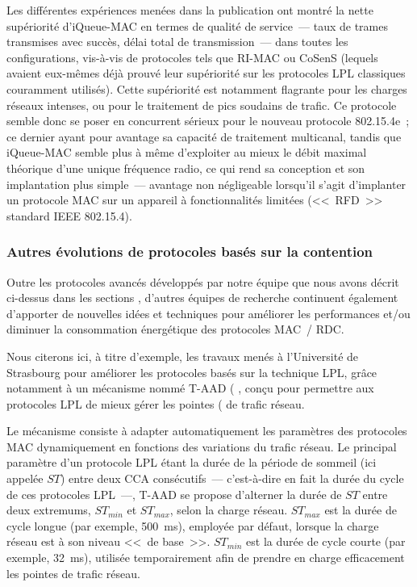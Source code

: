 Les différentes expériences menées dans la publication \cite{iQueueMAC}
ont montré la nette supériorité d'iQueue-MAC en termes de qualité de
service~--- taux de trames transmises avec succès, délai total de
transmission~--- dans toutes les configurations, vis-à-vis de protocoles
tels que RI-MAC ou CoSenS (lequels avaient eux-mêmes déjà prouvé leur
supériorité sur les protocoles LPL classiques couramment utilisés).
Cette supériorité est notamment flagrante pour les charges réseaux intenses,
ou pour le traitement de pics soudains de trafic. Ce protocole semble donc
se poser en concurrent sérieux pour le nouveau protocole 802.15.4e~;
ce dernier ayant pour avantage sa capacité de traitement multicanal, tandis
que iQueue-MAC semble plus à même d'exploiter au mieux le débit maximal
théorique d'une unique fréquence radio, ce qui rend sa conception
et son implantation plus simple~--- avantage non négligeable lorsqu'il
s'agit d'implanter un protocole MAC sur un appareil à fonctionnalités
limitées (<<~RFD~>> standard IEEE 802.15.4).

\subsubsection{Autres évolutions de protocoles basés sur la contention}
\label{ParProtoTNoel}

Outre les protocoles avancés développés par notre équipe que nous avons
décrit ci-dessus dans les sections ,
d'autres équipes de recherche continuent également d'apporter de
nouvelles idées et techniques pour améliorer les performances et/ou
diminuer la consommation énergétique des protocoles MAC~/ RDC.

\smallskip

Nous citerons ici, à titre d'exemple, les travaux menés à l'Université
de Strasbourg pour améliorer les protocoles basés sur la technique LPL,
grâce notamment à un mécanisme nommé T-AAD ( \cite{T-AAD}, conçu pour permettre aux protocoles LPL
de mieux gérer les pointes ( de trafic réseau.

Le mécanisme  consiste à adapter automatiquement les paramètres
des protocoles MAC dynamiquement en fonctions des variations du trafic
réseau. Le principal paramètre d'un protocole LPL étant la durée de la
période de sommeil (ici appelée $ST$) entre deux CCA consécutifs~---
c'est-à-dire en fait la durée du cycle de ces protocoles LPL~---,
T-AAD se propose d'alterner la durée de $ST$ entre deux extremums,
$ST_{min}$ et $ST_{max}$, selon la charge réseau. $ST_{max}$ est la durée
de cycle longue (par exemple, 500~ms), employée par défaut, lorsque la
charge réseau est à son niveau <<~de base~>>. $ST_{min}$ est la durée
de cycle courte (par exemple, 32~ms), utilisée temporairement afin
de prendre en charge efficacement les pointes de trafic réseau.

